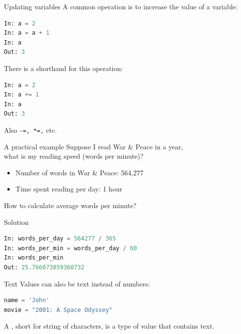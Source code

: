 \documentclass[aspectratio=169,usenames,dvipsnames]{beamer}
\begin{document}
\begin{frame}[fragile]{Updating variables}
A common operation is to increase the value of a variable:
\begin{lstlisting}[language=python]
In: a = 2
In: a = a + 1
In: a
Out: 3
\end{lstlisting}

\pause
There is a shorthand for this operation:
\begin{lstlisting}[language=python]
In: a = 2
In: a += 1
In: a
Out: 3
\end{lstlisting}

Also \lstinline{-=, *=,} etc.
\end{frame}


\begin{frame}{A practical example}
    Suppose I read War \& Peace in a year, \\
    what is my reading speed (words per minute)?
    \begin{itemize}
        \item Number of words in War \& Peace: 564,277
        \item Time spent reading per day: 1 hour
    \end{itemize}
    How to calculate average words per minute?
\end{frame}

\begin{frame}[fragile]{Solution}
\begin{lstlisting}[language=python]
In: words_per_day = 564277 / 365
In: words_per_min = words_per_day / 60
In: words_per_min
Out: 25.766073059360732
\end{lstlisting}
\end{frame}


\begin{frame}[fragile]{Text}
Values can also be text instead of numbers:
\begin{lstlisting}[language=python]
name = 'John'
movie = "2001: A Space Odyssey"
\end{lstlisting}

\pause
    \begin{definition}
        A , short for string of characters,
        is a type of value that contains text.
    \end{definition}
\end{frame}
\end{document}
